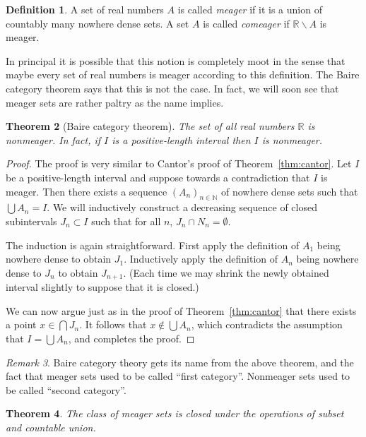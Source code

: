 \documentclass[11pt,oneside]{amsbook}
\newcommand{\NN}{\mathbb N}
\newcommand{\RR}{\mathbb R}
\theoremstyle{definition}
\theoremstyle{plain}
\newtheorem{thm}{Theorem}[section]
\theoremstyle{definition}
\newtheorem{defn}[thm]{Definition}
\theoremstyle{remark}
\newtheorem{rem}[thm]{Remark}
\numberwithin{equation}{section}
\numberwithin{figure}{section}
\begin{document}
\begin{defn}
  A set of real numbers $A$ is called \emph{meager} if it is a union of countably many nowhere dense sets. A set $A$ is called \emph{comeager} if $\RR\smallsetminus A$ is meager.
\end{defn}

In principal it is possible that this notion is completely moot in the sense that maybe every set of real numbers is meager according to this definition. The Baire category theorem says that this is not the case. In fact, we will soon see that meager sets are rather paltry as the name implies.

\begin{thm}[Baire category theorem]
  \label{thm:baire}
  The set of all real numbers $\RR$ is nonmeager. In fact, if $I$ is a positive-length interval then $I$ is nonmeager.
\end{thm}

\begin{proof}
  The proof is very similar to Cantor's proof of Theorem~\ref{thm:cantor}. Let $I$ be a positive-length interval and suppose towards a contradiction that $I$ is meager. Then there exists a sequence $(A_n)_{n\in\NN}$ of nowhere dense sets such that $\bigcup A_n=I$. We will inductively construct a decreasing sequence of closed subintervals $J_n\subset I$ such that for all $n$, $J_n\cap N_n=\emptyset$.

  The induction is again straightforward. First apply the definition of $A_1$ being nowhere dense to obtain $J_1$. Inductively apply the definition of $A_n$ being nowhere dense to $J_n$ to obtain $J_{n+1}$. (Each time we may shrink the newly obtained interval slightly to suppose that it is closed.)

  We can now argue just as in the proof of Theorem~\ref{thm:cantor} that there exists a point $x\in\bigcap J_n$. It follows that $x\notin\bigcup A_n$, which contradicts the assumption that $I=\bigcup A_n$, and completes the proof.
\end{proof}

\begin{rem}
  Baire category theory gets its name from the above theorem, and the fact that meager sets used to be called ``first category''. Nonmeager sets used to be called ``second category''.
\end{rem}

\begin{thm}
  \label{thm:meager-pres}
  The class of meager sets is closed under the operations of subset and countable union.
\end{thm}
\end{document}
